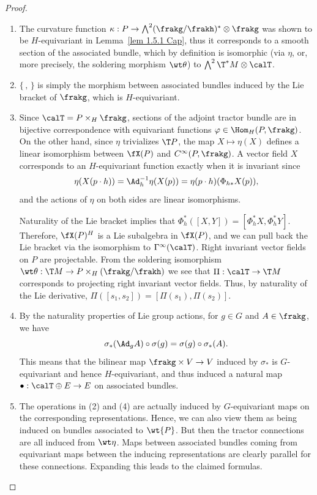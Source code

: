 \begin{proof}
    \begin{enumerate}[label=(\arabic*)]
        \item The curvature function $\kappa:P\to \bigwedge^2(\frakg\slash\frakh)^\ast\otimes\frakg$ was shown to be $H$-equivariant in Lemma~\ref{lem 1.5.1 Cap}, thus it corresponds to a smooth section of the associated bundle, which by definition is isomorphic (via $\eta$, or, more precisely, the soldering morphism $\wt\theta$) to $\bigwedge^2\T^\ast M\otimes\calT$.
        \item $\{\,,\,\}$ is simply the morphism between associated bundles induced by the Lie bracket of $\frakg$, which is $H$-equivariant.
        \item Since $\calT=P\times_H\frakg$, sections of the adjoint tractor bundle are in bijective correspondence with equivariant functions $\varphi\in\Hom_H(P,\frakg)$. On the other hand, since $\eta$ trivializes $\T P$, the map $X\mapsto \eta(X)$ defines a linear isomorphism between $\fX(P)$ and $C^\infty(P,\frakg)$. A vector field $X$ corresponds to an $H$-equivariant function exactly when it is invariant since
        \[\eta(X(p\cdot h))=\Ad_h^{-1}\eta(X(p))=\eta(p\cdot h)(\Phi_{h\ast}X(p)),\]
        and the actions of $\eta$ on both sides are linear isomorphisms.

        Naturality of the Lie bracket implies that $\Phi_h^\ast([X,Y])=[\Phi_h^\ast X,\Phi_h^\ast Y]$. Therefore, $\fX(P)^H$ is a Lie subalgebra in $\fX(P)$, and we can pull back the Lie bracket via the isomorphism to $\Gamma^\infty(\calT)$. Right invariant vector fields on $P$ are projectable. From the soldering isomorphism $\wt\theta:\T M\to P\times_H (\frakg\slash\frakh)$ we see that $\Pi:\calT\to \T M$ corresponds to projecting right invariant vector fields. Thus, by naturality of the Lie derivative, $\Pi([s_1,s_2])=[\Pi(s_1),\Pi(s_2)]$.
        \item By the naturality properties of Lie group actions, for $g\in G$ and $A\in\frakg$, we have
        \[\sigma_\ast(\Ad_g A)\circ \sigma(g)=\sigma(g)\circ \sigma_\ast(A).\]
        This means that the bilinear map $\frakg\times V\to V$ induced by $\sigma_\ast$ is $G$-equivariant and hence $H$-equivariant, and thus induced a natural map $\bullet:\calT\oplus E\to E$ on associated bundles.
        \item The operations in (2) and (4) are actually induced by $G$-equivariant maps on the corresponding representations. Hence, we can also view them as being induced on bundles associated to $\wt{P}$. But then the tractor connections are all induced from $\wt\eta$. Maps between associated bundles coming from equivariant maps between the inducing representations are clearly parallel for these connections. Expanding this leads to the claimed formulas.
    \end{enumerate}
\end{proof}


